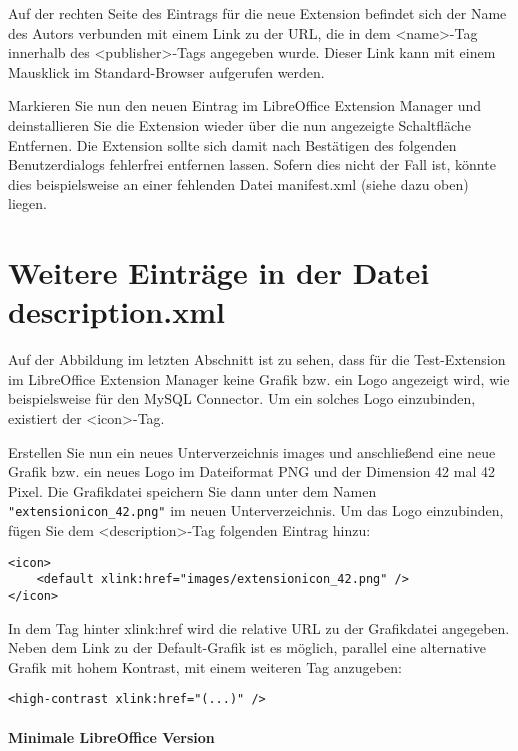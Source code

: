 \documentclass[a4paper,10pt,pagesize,titlepage]{scrbook}
\begin{document}
Auf der rechten Seite des Eintrags für die neue Extension befindet sich der Name des Autors verbunden mit einem Link zu der URL, die in dem <name>-Tag innerhalb des <publisher>-Tags angegeben wurde. Dieser Link kann mit einem Mausklick im Standard-Browser aufgerufen werden.

Markieren Sie nun den neuen Eintrag im LibreOffice Extension Manager und deinstallieren Sie die Extension wieder über die nun angezeigte Schaltfläche \glqq Entfernen\grqq. Die Extension sollte sich damit nach Bestätigen des folgenden Benutzerdialogs fehlerfrei entfernen lassen. Sofern dies nicht der Fall ist, könnte dies beispielsweise an einer fehlenden Datei manifest.xml (siehe dazu oben) liegen.

\section{Weitere Einträge in der Datei description.xml}\label{weitere_eintraege_description}

Auf der Abbildung im letzten Abschnitt ist zu sehen, dass für die Test-Extension im LibreOffice Extension Manager keine Grafik bzw. ein Logo angezeigt wird, wie beispielsweise für den MySQL Connector. Um ein solches Logo einzubinden, existiert der <icon>-Tag.

Erstellen Sie nun ein neues Unterverzeichnis \glqq images \grqq und anschließend eine neue Grafik bzw. ein neues Logo im Dateiformat PNG und der Dimension 42 mal 42 Pixel. Die Grafikdatei speichern Sie dann unter dem Namen \verb|"extensionicon_42.png"| im neuen Unterverzeichnis. Um das Logo einzubinden, fügen Sie dem <description>-Tag folgenden Eintrag hinzu:

\begin{lstlisting}
<icon>
    <default xlink:href="images/extensionicon_42.png" />
</icon>
\end{lstlisting}

In dem Tag hinter \glqq xlink:href \grqq wird die relative URL zu der Grafikdatei angegeben. Neben dem Link zu der Default-Grafik ist es möglich, parallel eine alternative Grafik mit hohem Kontrast, mit einem weiteren Tag anzugeben:
\begin{lstlisting}
<high-contrast xlink:href="(...)" />
\end{lstlisting}

\paragraph*{Minimale LibreOffice Version}$~~$\\
\end{document}
